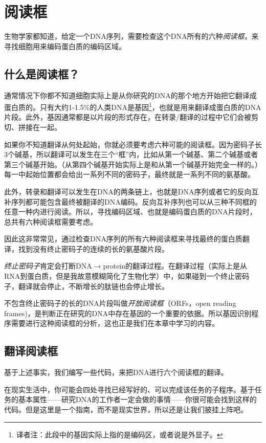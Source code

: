 \section{阅读框}
生物学家都知道，给定一个DNA序列，需要检查这个DNA所有的六种\textit{阅读框}，来寻找细胞用来编码蛋白质的编码区域。

\subsection{什么是阅读框？}
通常情况下你都不知道细胞实际上是从你研究的DNA的那个地方开始把它翻译成蛋白质的。只有大约1-1.5\%的人类DNA是基因\footnote{译者注：此段中的基因实际上指的是编码区，或者说是外显子。}，也就是用来翻译成蛋白质的DNA片段。此外，基因通常都是以片段的形式存在，在转录/翻译的过程中它们会被剪切、拼接在一起。

如果你不知道翻译从何处起始，你就必须要考虑六种可能的阅读框。因为密码子长3个碱基，所以翻译可以发生在三个“框”内，比如从第一个碱基、第二个碱基或者第三个碱基开始。（从第四个碱基开始实际上是和从第一个碱基开始完全一样的。）每一中起始位置都会给出一系列不同的密码子，最终就是一系列不同的氨基酸。

此外，转录和翻译可以发生在DNA的两条链上，也就是DNA序列或者它的反向互补序列都可能包含最终被翻译的DNA编码。反向互补序列也可以从三种不同框的任意一种内进行阅读。所以，寻找编码区域、也就是编码蛋白质的DNA片段时，总共有六种阅读框需要考虑。

因此这非常常见，通过检查DNA序列的所有六种阅读框来寻找最终的蛋白质翻译，找到没有终止密码子的连续的长的氨基酸片段。

\textit{终止密码子}肯定会打断DNA$\rightarrow$protein的翻译过程。在翻译过程（实际上是从RNA到蛋白质，但是我故意模糊简化了生物化学）中，如果碰到一个终止密码子，翻译就会停止，不断增长的肽链也会停止增长。

不包含终止密码子的长的DNA片段叫做\textit{开放阅读框}（ORFs，open reading
frames)，是判断正在研究的DNA中存在基因的一个重要的依据。所以基因识别程序需要进行这种阅读框的分析，这也正是我们在本章中学习的内容。

\subsection{翻译阅读框}
基于上述事实，我们编写一些代码，来把DNA进行六个阅读框的翻译。

在现实生活中，你可能会四处寻找已经写好的、可以完成该任务的子程序。基于任务的基本属性——研究DNA的工作者一定会做的事情——你很可能会找到这样的代码。但是这里是一个指南，而不是现实世界，所以还是让我们披挂上阵吧。

